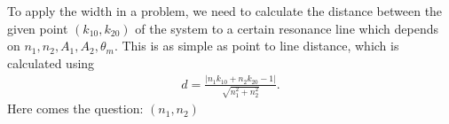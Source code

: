 \documentclass[letterpaper,12pt,english]{sphinxmanual}
\begin{document}
To apply the width in a problem, we need to calculate the distance between the given point \((k_{10},k_{20})\) of the system to a certain resonance line which depends on \(n_1,n_2,A_1,A_2,\theta_m\). This is as simple as point to line distance, which is calculated using
\label{\detokenize{matter-stimulated/two-frequency:equation-stimulated-2-freq-distance-0}}\begin{equation}\label{equation:matter-stimulated/two-frequency:stimulated-2-freq-distance-0}
\begin{split}d = \frac{\lvert n_1 k_{10} + n_2 k_{20} - 1 \rvert}{\sqrt{n_1^2 + n_2^2} }.\end{split}
\end{equation}
Here comes the question:  \((n_1,n_2)\) 
\end{document}
